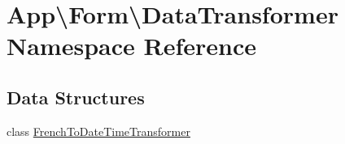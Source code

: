 \hypertarget{namespace_app_1_1_form_1_1_data_transformer}{}\section{App\textbackslash{}Form\textbackslash{}Data\+Transformer Namespace Reference}
\label{namespace_app_1_1_form_1_1_data_transformer}
\subsection*{Data Structures}
\begin{DoxyCompactItemize}
\item 
class \mbox{\hyperlink{class_app_1_1_form_1_1_data_transformer_1_1_french_to_date_time_transformer}{French\+To\+Date\+Time\+Transformer}}
\end{DoxyCompactItemize}
